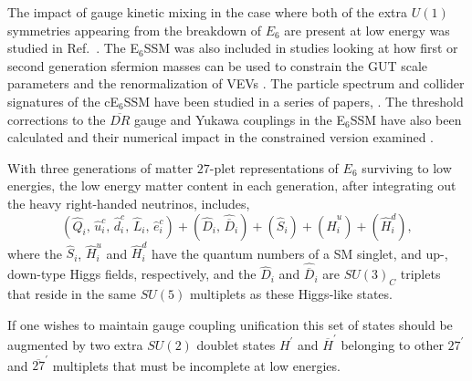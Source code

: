 \documentclass[preprint,amsmath,amssymb,aps,superscriptaddress,prd,
showpacs,floatfix,nofootinbib]{revtex4-1}
\newcommand{\be}{\begin{equation}}
\newcommand{\ee}{\end{equation}}
\begin{document}
The impact of gauge kinetic mixing in the case where both of the extra
$U(1)$ symmetries appearing from the breakdown of $E_6$ are present at
low energy was studied in Ref.~\cite{Rizzo:2012rf}.  The E$_6$SSM was also
included in studies looking at how first or second generation sfermion
masses can be used to constrain the GUT scale parameters \cite{Miller:2012vn}
and the renormalization of VEVs \cite{Sperling:2013eva, Sperling:2013xqa}.
The particle spectrum and collider signatures of the cE$_6$SSM have been
studied in a series of papers, \cite{Athron:2009ue, Athron:2009bs,
Athron:2011wu,Athron:2012sq}.  The threshold corrections to the
$\overline{DR}$ gauge and Yukawa couplings in the E$_6$SSM have also been
calculated and their numerical impact in the constrained version examined
\cite{Athron:2012pw}.

With three generations of matter $27$-plet representations of $E_6$
surviving to low energies, the low energy matter content in each generation,
after integrating out the heavy right-handed neutrinos, includes, \be
(\hat{Q}_i, \, \hat{u}^c_i, \, \hat{d}^c_i, \, \hat{L}_i, \, \hat{e}^c_i)
+ (\hat{D}_i, \, \hat{\overline{D}}_i) + (\hat{S}_{i}) + (\hat{H}^u_i)
+ (\hat{H}^d_i) ,\ee
where the $\hat{S}_{i}$, $\hat{H}^u_i$ and $\hat{H}^d_i$ have the quantum
numbers of a SM singlet, and up-, down-type Higgs fields, respectively, and
the $\hat{D}_i$ and $\hat{\overline{D}}_i$ are $SU(3)_C$ triplets that reside
in the same $SU(5)$ multiplets as these Higgs-like states.

If one wishes to maintain gauge coupling unification this set of states should
be augmented by two extra $SU(2)$ doublet states $H^\prime$ and
$\overline{H}^\prime$ belonging to other $27^\prime$ and $\overline{27}^\prime$
multiplets that must be incomplete at low energies.
\end{document}
